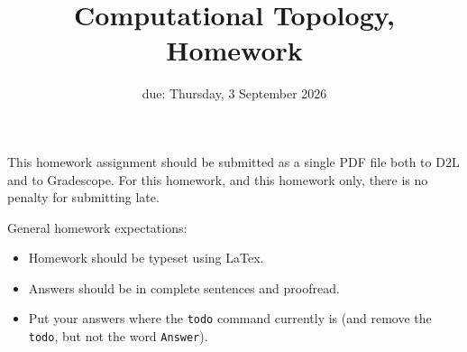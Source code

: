 \documentclass{article}
\title{Computational Topology, Homework \hwnum}
\author{\todo{Your Name Here}}
\date{due: Thursday, 3 September 2026}
\begin{document}
\maketitle

This homework assignment should be
submitted as a single PDF file both to D2L and to Gradescope.  For this
homework, and this homework only, there is no penalty for submitting late.

General homework expectations:
\begin{itemize}
    \item Homework should be typeset using LaTex.
    \item Answers should be in complete sentences and proofread.
    \item Put your answers where the \texttt{todo} command currently is (and
        remove the \texttt{todo}, but not the word \texttt{Answer}).
\end{itemize}

\end{document}
